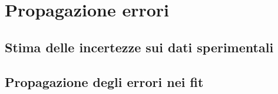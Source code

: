 \documentclass[../main.tex]{subfiles}
\begin{document}
\section{Propagazione errori}
\subsection{Stima delle incertezze sui dati sperimentali}
\label{subsec:propagazione-errori-misure}

\subsection{Propagazione degli errori nei fit}
\label{subsec:propagazione-errori-log}
\end{document}
